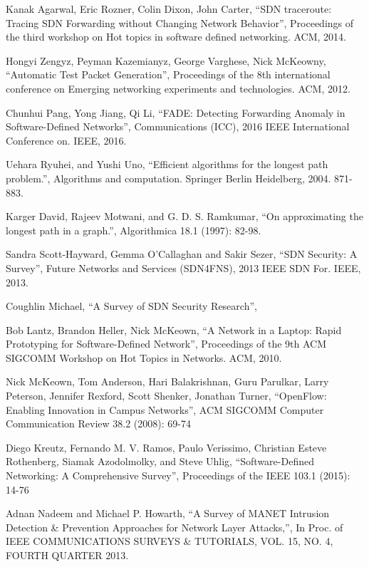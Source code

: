 \begin{thebibliography}{1}

Kanak Agarwal, Eric Rozner, Colin Dixon, John Carter,
``SDN traceroute: Tracing SDN Forwarding without Changing Network Behavior'', Proceedings of the third workshop on Hot topics in software defined networking. ACM, 2014.

Hongyi Zengyz, Peyman Kazemianyz, George Varghese, Nick McKeowny,
``Automatic Test Packet Generation'', Proceedings of the 8th international conference on Emerging networking experiments and technologies. ACM, 2012.

Chunhui Pang, Yong Jiang, Qi Li,
``FADE: Detecting Forwarding Anomaly in Software-Defined Networks'', Communications (ICC), 2016 IEEE International Conference on. IEEE, 2016.

Uehara Ryuhei, and Yushi Uno,
``Efficient algorithms for the longest path problem.'', Algorithms and computation. Springer Berlin Heidelberg, 2004. 871-883.

Karger David, Rajeev Motwani, and G. D. S. Ramkumar,
``On approximating the longest path in a graph.'', Algorithmica 18.1 (1997): 82-98.

Sandra Scott-Hayward, Gemma O’Callaghan and Sakir Sezer,
``SDN Security: A Survey'', Future Networks and Services (SDN4FNS), 2013 IEEE SDN For. IEEE, 2013.

Coughlin Michael,
``A Survey of SDN Security Research'',

Bob Lantz, Brandon Heller, Nick McKeown,
``A Network in a Laptop: Rapid Prototyping for Software-Defined Network'', Proceedings of the 9th ACM SIGCOMM Workshop on Hot Topics in Networks. ACM, 2010.

Nick McKeown, Tom Anderson, Hari Balakrishnan, Guru Parulkar, Larry Peterson, Jennifer Rexford, Scott Shenker, Jonathan Turner,
``OpenFlow: Enabling Innovation in Campus Networks'', ACM SIGCOMM Computer Communication Review 38.2 (2008): 69-74

Diego Kreutz, Fernando M. V. Ramos, Paulo Verissimo, Christian Esteve Rothenberg, Siamak Azodolmolky, 
and Steve Uhlig,
``Software-Defined Networking: A Comprehensive Survey'', Proceedings of the IEEE 103.1 (2015): 14-76

Adnan Nadeem and Michael P. Howarth,
``A Survey of MANET Intrusion Detection \& Prevention Approaches for Network Layer Attacks,'', In Proc. of IEEE COMMUNICATIONS SURVEYS \& TUTORIALS, VOL. 15, NO. 4, FOURTH QUARTER 2013.


\end{thebibliography}
